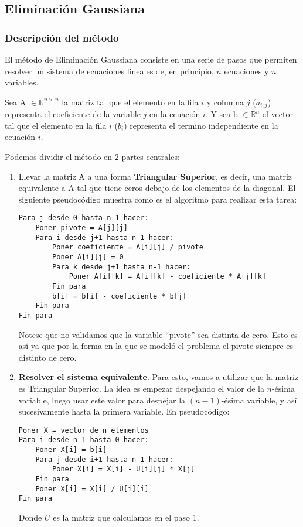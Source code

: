 \subsection{Eliminación Gaussiana}

\subsubsection{Descripción del método}

El método de Eliminación Gaussiana consiste en una serie de pasos que permiten resolver un sistema de ecuaciones lineales de, en principio, $n$ ecuaciones y $n$ variables.

Sea A $\in \mathbb{R}^{n \times\ n}$ la matriz tal que el elemento en la fila $i$ y columna $j$ ($a_{i,j}$) representa el coeficiente de la variable $j$ en la ecuación $i$.
Y sea b $\in \mathbb{R}^{n}$ el vector tal que el elemento en la fila $i$ ($b_{i}$) representa el termino independiente en la ecuación $i$.

Podemos dividir el método en 2 partes centrales:
\begin{enumerate}
    \item Llevar la matriz A a una forma \textbf{Triangular Superior}, es decir, una matriz equivalente a A tal que tiene ceros debajo de los elementos de la diagonal. El siguiente pseudocódigo muestra como es el algoritmo para realizar esta tarea:

\begin{lstlisting}
Para j desde 0 hasta n-1 hacer:
    Poner pivote = A[j][j]
    Para i desde j+1 hasta n-1 hacer:
        Poner coeficiente = A[i][j] / pivote
        Poner A[i][j] = 0
        Para k desde j+1 hasta n-1 hacer:
            Poner A[i][k] = A[i][k] - coeficiente * A[j][k]
        Fin para
        b[i] = b[i] - coeficiente * b[j]
    Fin para
Fin para
\end{lstlisting}

		Notese que no validamos que la variable ``pivote'' sea distinta de cero. Esto es así ya que por la forma en la que se modeló el problema el pivote siempre es distinto de cero.

    \item \textbf{Resolver el sistema equivalente}. Para esto, vamos a utilizar que la matriz es Triangular Superior. La idea es empezar despejando el valor de la $n$-ésima variable, luego usar este valor para despejar la $(n-1)$-ésima variable, y así sucesivamente hasta la primera variable. En pseudocódigo:

\begin{lstlisting}
Poner X = vector de n elementos
Para i desde n-1 hasta 0 hacer:
    Poner X[i] = b[i]
    Para j desde i+1 hasta n-1 hacer:
        Poner X[i] = X[i] - U[i][j] * X[j]
    Fin para
    Poner X[i] = X[i] / U[i][i]
Fin para
\end{lstlisting}

		Donde $U$ es la matriz que calculamos en el paso 1.

  \end{enumerate}


